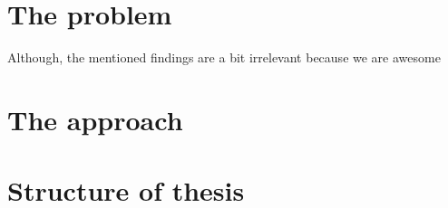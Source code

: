\section{The problem}

Although, the mentioned findings are a bit irrelevant because we are awesome



\section{The approach}
\section{Structure of thesis}
